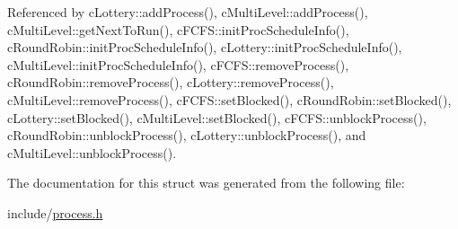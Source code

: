 \-Referenced by c\-Lottery\-::add\-Process(), c\-Multi\-Level\-::add\-Process(), c\-Multi\-Level\-::get\-Next\-To\-Run(), c\-F\-C\-F\-S\-::init\-Proc\-Schedule\-Info(), c\-Round\-Robin\-::init\-Proc\-Schedule\-Info(), c\-Lottery\-::init\-Proc\-Schedule\-Info(), c\-Multi\-Level\-::init\-Proc\-Schedule\-Info(), c\-F\-C\-F\-S\-::remove\-Process(), c\-Round\-Robin\-::remove\-Process(), c\-Lottery\-::remove\-Process(), c\-Multi\-Level\-::remove\-Process(), c\-F\-C\-F\-S\-::set\-Blocked(), c\-Round\-Robin\-::set\-Blocked(), c\-Lottery\-::set\-Blocked(), c\-Multi\-Level\-::set\-Blocked(), c\-F\-C\-F\-S\-::unblock\-Process(), c\-Round\-Robin\-::unblock\-Process(), c\-Lottery\-::unblock\-Process(), and c\-Multi\-Level\-::unblock\-Process().



\-The documentation for this struct was generated from the following file\-:\begin{DoxyCompactItemize}
\item 
include/\hyperlink{process_8h}{process.\-h}\end{DoxyCompactItemize}
